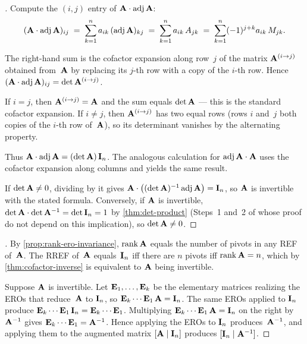 \begin{proof}[]
Compute the $(i, j)$ entry of $\mathbf{A} \cdot \operatorname{adj} \mathbf{A}$:
\[
  (\mathbf{A} \cdot \operatorname{adj} \mathbf{A})_{ij}
  \;=\; \sum_{k=1}^{n} a_{ik}\,(\operatorname{adj} \mathbf{A})_{kj}
  \;=\; \sum_{k=1}^{n} a_{ik}\,A_{jk}
  \;=\; \sum_{k=1}^{n} (-1)^{j+k} a_{ik}\,M_{jk}.
\]

The right-hand sum is the cofactor expansion along row~$j$ of the
matrix $\mathbf{A}^{(i \to j)}$ obtained from~$\mathbf{A}$ by replacing its
$j$-th row with a copy of the $i$-th row. Hence
$(\mathbf{A} \cdot \operatorname{adj} \mathbf{A})_{ij} = \det \mathbf{A}^{(i \to j)}$.

If $i = j$, then $\mathbf{A}^{(i \to j)} = \mathbf{A}$ and the sum equals
$\det \mathbf{A}$ — this is the standard cofactor expansion. If $i \neq j$,
then $\mathbf{A}^{(i \to j)}$ has two equal rows (rows $i$ and~$j$ both
copies of the $i$-th row of~$\mathbf{A}$), so its determinant
vanishes by the alternating property.

Thus $\mathbf{A} \cdot \operatorname{adj} \mathbf{A} = (\det \mathbf{A})\,\mathbf{I}_n$. The
analogous calculation for $\operatorname{adj} \mathbf{A} \cdot \mathbf{A}$ uses the
cofactor expansion along columns and yields the same result.

If $\det \mathbf{A} \neq 0$, dividing by it gives
$\mathbf{A} \cdot \bigl((\det \mathbf{A})^{-1} \operatorname{adj} \mathbf{A}\bigr) = \mathbf{I}_n$,
so $\mathbf{A}$ is invertible with the stated formula. Conversely, if
$\mathbf{A}$ is invertible, $\det \mathbf{A} \cdot \det \mathbf{A}^{-1} = \det \mathbf{I}_n = 1$
by \cref{thm:det-product} (Steps~1 and~2 of whose proof do not depend
on this implication), so $\det \mathbf{A} \neq 0$.
\end{proof}

\begin{proof}[]
By \cref{prop:rank-ero-invariance}, $\operatorname{rank} \mathbf{A}$ equals the number of
pivots in any REF of~$\mathbf{A}$. The RREF of~$\mathbf{A}$ equals~$\mathbf{I}_n$
iff there are $n$ pivots iff $\operatorname{rank} \mathbf{A} = n$, which by
\cref{thm:cofactor-inverse} is equivalent to $\mathbf{A}$ being invertible.

Suppose $\mathbf{A}$ is invertible. Let $\mathbf{E}_1, \dots, \mathbf{E}_k$ be
the elementary matrices realizing the EROs that reduce~$\mathbf{A}$ to
$\mathbf{I}_n$, so $\mathbf{E}_k \cdots \mathbf{E}_1\,\mathbf{A} = \mathbf{I}_n$. The
same EROs applied to $\mathbf{I}_n$ produce
$\mathbf{E}_k \cdots \mathbf{E}_1\,\mathbf{I}_n = \mathbf{E}_k \cdots \mathbf{E}_1$.
Multiplying $\mathbf{E}_k \cdots \mathbf{E}_1\,\mathbf{A} = \mathbf{I}_n$ on the
right by~$\mathbf{A}^{-1}$ gives $\mathbf{E}_k \cdots \mathbf{E}_1 = \mathbf{A}^{-1}$.
Hence applying the EROs to $\mathbf{I}_n$ produces~$\mathbf{A}^{-1}$, and
applying them to the augmented matrix $[\mathbf{A} \mid \mathbf{I}_n]$
produces $[\mathbf{I}_n \mid \mathbf{A}^{-1}]$.
\end{proof}

